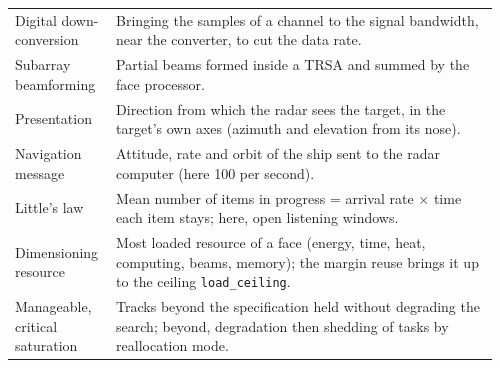\documentclass[11pt,a4paper]{article}
\newcommand{\code}[1]{\texttt{\small #1}}
\begin{document}
{\begin{longtable}{@{}p{0.2\linewidth}p{0.76\linewidth}@{}}
Digital down-conversion & Bringing the samples of a channel to the signal bandwidth, near the converter, to cut the data
rate.\\
Subarray beamforming & Partial beams formed inside a TRSA and summed by the face processor.\\
Presentation & Direction from which the radar sees the target, in the target's own axes (azimuth and elevation
from its nose).\\
Navigation message & Attitude, rate and orbit of the ship sent to the radar computer (here 100 per second).\\
Little's law & Mean number of items in progress = arrival rate $\times$ time each item stays; here, open listening
windows.\\
Dimensioning resource & Most loaded resource of a face (energy, time, heat, computing, beams, memory); the margin reuse
brings it up to the ceiling \code{load\_ceiling}.\\
Manageable, critical saturation & Tracks beyond the specification held without degrading the search; beyond,
degradation then shedding of tasks by reallocation mode.\\
\bottomrule
\end{longtable}}
\end{document}

